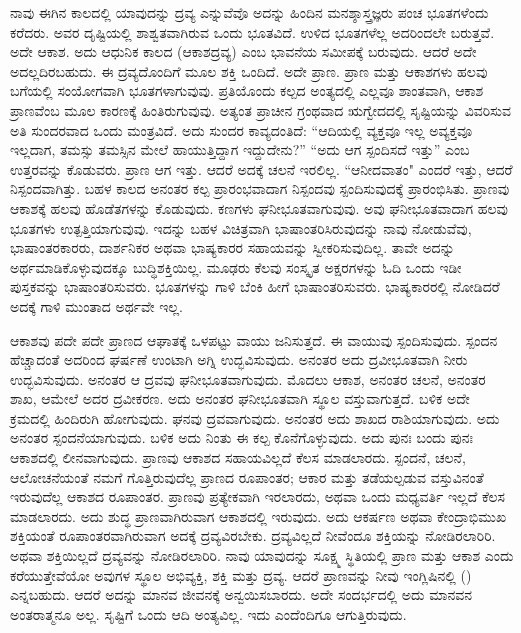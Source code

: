 \vskip 5pt

ನಾವು ಈಗಿನ ಕಾಲದಲ್ಲಿ ಯಾವುದನ್ನು ದ್ರವ್ಯ ಎನ್ನುವೆವೊ ಅದನ್ನು ಹಿಂದಿನ ಮನಶ್ಶಾಸ್ತ್ರಜ್ಞರು ಪಂಚ ಭೂತಗಳೆಂದು ಕರೆದರು. ಅವರ ದೃಷ್ಟಿಯಲ್ಲಿ ಶಾಶ್ವತವಾಗಿರುವ ಒಂದು ಭೂತವಿದೆ. ಉಳಿದ ಭೂತಗಳೆಲ್ಲ ಅದರಿಂದಲೇ ಬರುತ್ತವೆ. ಅದೇ ಆಕಾಶ. ಅದು ಆಧುನಿಕ ಕಾಲದ  (ಆಕಾಶದ್ರವ್ಯ) ಎಂಬ ಭಾವನೆಯ ಸಮೀಪಕ್ಕೆ ಬರುವುದು. ಆದರೆ ಅದೇ ಅದಲ್ಲದಿರಬಹುದು. ಈ ದ್ರವ್ಯದೊಂದಿಗೆ ಮೂಲ ಶಕ್ತಿ ಒಂದಿದೆ. ಅದೇ ಪ್ರಾಣ. ಪ್ರಾಣ ಮತ್ತು ಆಕಾಶಗಳು ಹಲವು ಬಗೆಯಲ್ಲಿ ಸಂಯೋಗವಾಗಿ ಭೂತಗಳಾಗುವುವು. ಪ್ರತಿಯೊಂದು ಕಲ್ಪದ ಅಂತ್ಯದಲ್ಲಿ ಎಲ್ಲವೂ ಶಾಂತವಾಗಿ, ಆಕಾಶ ಪ್ರಾಣವೆಂಬ ಮೂಲ ಕಾರಣಕ್ಕೆ ಹಿಂತಿರುಗುವುವು. ಅತ್ಯಂತ ಪ್ರಾಚೀನ ಗ್ರಂಥವಾದ ಋಗ್ವೇದದಲ್ಲಿ ಸೃಷ್ಟಿಯನ್ನು ವಿವರಿಸುವ ಅತಿ ಸುಂದರವಾದ ಒಂದು ಮಂತ್ರವಿದೆ. ಅದು ಸುಂದರ ಕಾವ್ಯದಂತಿದೆ: “ಆದಿಯಲ್ಲಿ ವ್ಯಕ್ತವೂ ಇಲ್ಲ ಅವ್ಯಕ್ತವೂ ಇಲ್ಲದಾಗ, ತಮಸ್ಸು ತಮಸ್ಸಿನ ಮೇಲೆ ಹಾಯುತ್ತಿದ್ದಾಗ ಇದ್ದುದೇನು?” “ಅದು ಆಗ ಸ್ಪಂದಿಸದೆ ಇತ್ತು” ಎಂಬ ಉತ್ತರವನ್ನು ಕೊಡುವರು. ಪ್ರಾಣ ಆಗ ಇತ್ತು. ಆದರೆ ಅದಕ್ಕೆ ಚಲನೆ ಇರಲಿಲ್ಲ. “ಆನೀದವಾತಂ" ಎಂದರೆ ಇತ್ತು, ಆದರೆ ನಿಸ್ಪಂದವಾಗಿತ್ತು. ಬಹಳ ಕಾಲದ ಅನಂತರ ಕಲ್ಪ ಪ್ರಾರಂಭವಾದಾಗ ನಿಸ್ಪಂದವು ಸ್ಪಂದಿಸುವುದಕ್ಕೆ ಪ್ರಾರಂಭಿಸಿತು. ಪ್ರಾಣವು ಆಕಾಶಕ್ಕೆ ಹಲವು ಹೊಡೆತಗಳನ್ನು ಕೊಡುವುದು. ಕಣಗಳು ಘನೀಭೂತವಾಗುವುವು. ಅವು ಘನೀಭೂತವಾದಾಗ ಹಲವು ಭೂತಗಳು ಉತ್ಪತ್ತಿಯಾಗುವುವು. ಇದನ್ನು ಬಹಳ ವಿಚಿತ್ರವಾಗಿ ಭಾಷಾಂತರಿಸಿರುವುದನ್ನು ನಾವು ನೋಡುವೆವು, ಭಾಷಾಂತರಕಾರರು, ದಾರ್ಶನಿಕರ ಅಥವಾ ಭಾಷ್ಯಕಾರರ ಸಹಾಯವನ್ನು ಸ್ವೀಕರಿಸುವುದಿಲ್ಲ. ತಾವೇ ಅದನ್ನು ಅರ್ಥಮಾಡಿಕೊಳ್ಳುವುದಕ್ಕೂ ಬುದ್ಧಿಶಕ್ತಿಯಿಲ್ಲ. ಮೂಢರು ಕೆಲವು ಸಂಸ್ಕೃತ ಅಕ್ಷರಗಳನ್ನು ಓದಿ ಒಂದು ಇಡೀ ಪುಸ್ತಕವನ್ನು ಭಾಷಾಂತರಿಸುವರು. ಭೂತಗಳನ್ನು ಗಾಳಿ ಬೆಂಕಿ ಹೀಗೆ ಭಾಷಾಂತರಿಸುವರು. ಭಾಷ್ಯಕಾರರಲ್ಲಿ ನೋಡಿದರೆ ಅದಕ್ಕೆ ಗಾಳಿ ಮುಂತಾದ ಅರ್ಥವೇ ಇಲ್ಲ.

\vskip 5pt

ಆಕಾಶವು ಪದೇ ಪದೇ ಪ್ರಾಣದ ಆಘಾತಕ್ಕೆ ಒಳಪಟ್ಟು ವಾಯು ಜನಿಸುತ್ತದೆ. ಈ ವಾಯುವು ಸ್ಪಂದಿಸುವುದು. ಸ್ಪಂದನ ಹೆಚ್ಚಾದಂತೆ ಅದರಿಂದ ಘರ್ಷಣೆ ಉಂಟಾಗಿ ಅಗ್ನಿ ಉದ್ಭವಿಸುವುದು. ಅನಂತರ ಅದು ದ್ರವೀಭೂತವಾಗಿ ನೀರು ಉದ್ಭವಿಸುವುದು. ಅನಂತರ ಆ ದ್ರವವು ಘನೀಭೂತವಾಗುವುದು. ಮೊದಲು ಆಕಾಶ, ಅನಂತರ ಚಲನೆ, ಅನಂತರ ಶಾಖ, ಆಮೇಲೆ ಅದರ ದ್ರವೀಕರಣ. ಅದು ಅನಂತರ ಘನೀಭೂತವಾಗಿ ಸ್ಥೂಲ ವಸ್ತುವಾಗುತ್ತದೆ. ಬಳಿಕ ಅದೇ ಕ್ರಮದಲ್ಲಿ ಹಿಂದಿರುಗಿ ಹೋಗುವುದು. ಘನವು ದ್ರವವಾಗುವುದು. ಅನಂತರ ಅದು ಶಾಖದ ರಾಶಿಯಾಗುವುದು. ಅದು ಅನಂತರ ಸ್ಪಂದನೆಯಾಗುವುದು. ಬಳಿಕ ಅದು ನಿಂತು ಈ ಕಲ್ಪ ಕೊನೆಗೊಳ್ಳುವುದು. ಅದು ಪುನಃ ಬಂದು ಪುನಃ ಆಕಾಶದಲ್ಲಿ ಲೀನವಾಗುವುದು. ಪ್ರಾಣವು ಆಕಾಶದ ಸಹಾಯವಿಲ್ಲದೆ ಕೆಲಸ ಮಾಡಲಾರದು. ಸ್ಪಂದನೆ, ಚಲನೆ, ಆಲೋಚನೆಯಂತೆ ನಮಗೆ ಗೊತ್ತಿರುವುದೆಲ್ಲ ಪ್ರಾಣದ ರೂಪಾಂತರ; ಆಕಾರ ಮತ್ತು ತಡೆಯಲ್ಪಡುವ ವಸ್ತುವಿನಂತೆ ಇರುವುದೆಲ್ಲ ಆಕಾಶದ ರೂಪಾಂತರ. ಪ್ರಾಣವು ಪ್ರತ್ಯೇಕವಾಗಿ ಇರಲಾರದು, ಅಥವಾ ಒಂದು ಮಧ್ಯವರ್ತಿ ಇಲ್ಲದೆ ಕೆಲಸ ಮಾಡಲಾರದು. ಅದು ಶುದ್ಧ ಪ್ರಾಣವಾಗಿರುವಾಗ ಆಕಾಶದಲ್ಲಿ ಇರುವುದು. ಅದು ಆಕರ್ಷಣ ಅಥವಾ ಕೇಂದ್ರಾಭಿಮುಖ ಶಕ್ತಿಯಂತೆ ರೂಪಾಂತರವಾಗಿರುವಾಗ ಅದಕ್ಕೆ ದ್ರವ್ಯವಿರಬೇಕು. ದ್ರವ್ಯವಿಲ್ಲದೆ ನೀವೆಂದೂ ಶಕ್ತಿಯನ್ನು ನೋಡಿರಲಾರಿರಿ. ಅಥವಾ ಶಕ್ತಿಯಿಲ್ಲದೆ ದ್ರವ್ಯವನ್ನು ನೋಡಿರಲಾರಿರಿ. ನಾವು ಯಾವುದನ್ನು ಸೂಕ್ಷ್ಮ ಸ್ಥಿತಿಯಲ್ಲಿ ಪ್ರಾಣ ಮತ್ತು ಆಕಾಶ ಎಂದು ಕರೆಯುತ್ತೇವೆಯೋ ಅವುಗಳ ಸ್ಥೂಲ ಅಭಿವ್ಯಕ್ತಿ, ಶಕ್ತಿ ಮತ್ತು ದ್ರವ್ಯ. ಆದರೆ ಪ್ರಾಣವನ್ನು ನೀವು ಇಂಗ್ಲಿಷಿನಲ್ಲಿ () ಎನ್ನಬಹುದು. ಆದರೆ ಅದನ್ನು ಮಾನವ ಜೀವನಕ್ಕೆ ಅನ್ವಯಿಸಬಾರದು. ಅದೇ ಸಂದರ್ಭದಲ್ಲಿ ಅದು ಮಾನವನ ಅಂತರಾತ್ಮನೂ ಅಲ್ಲ. ಸೃಷ್ಟಿಗೆ ಒಂದು ಆದಿ ಅಂತ್ಯವಿಲ್ಲ. ಇದು ಎಂದೆಂದಿಗೂ ಆಗುತ್ತಿರುವುದು.

